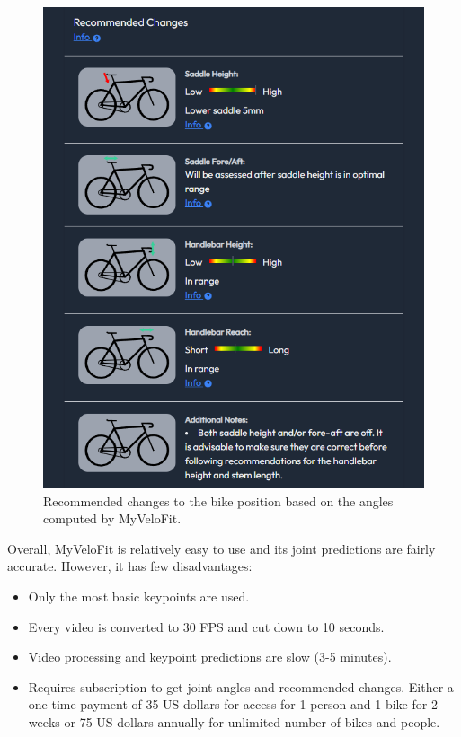 \begin{figure}[htbp]
    \centering
    \includegraphics[width=\textwidth]{obrazky-figures/myvelofit_suggestions.png}
    \caption{Recommended changes to the bike position based on the angles computed by MyVeloFit.}
    \label{fig:myvelofit_suggestions}
\end{figure}

Overall, MyVeloFit is relatively easy to use and its joint predictions are fairly accurate. However, it has few disadvantages:

\begin{itemize}
    \item Only the most basic keypoints are used.
    \item Every video is converted to 30 FPS and cut down to 10 seconds.
    \item Video processing and keypoint predictions are slow (3-5 minutes).
    \item Requires subscription to get joint angles and recommended changes. Either a one time payment of 35 US dollars for access for 1 person and 1 bike for 2 weeks or 75 US dollars annually for unlimited number of bikes and people.
\end{itemize}


